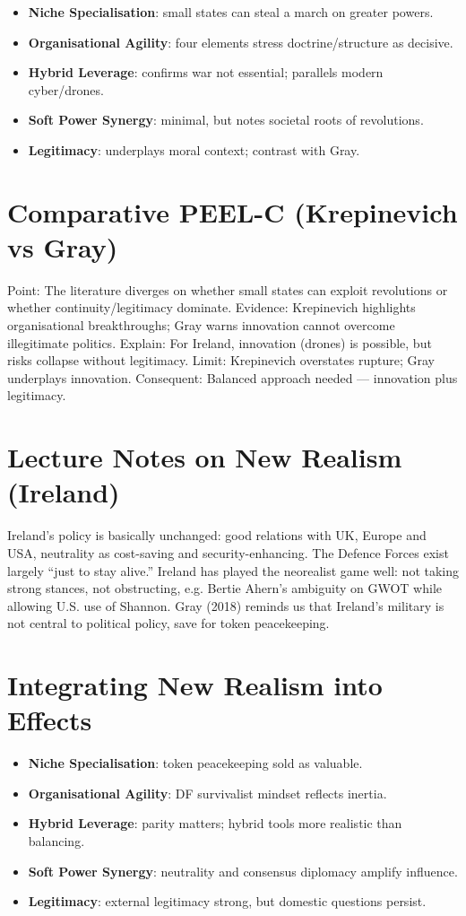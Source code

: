 \begin{itemize}
	\item \textbf{Niche Specialisation}: small states can steal a march on greater powers.  
	\item \textbf{Organisational Agility}: four elements stress doctrine/structure as decisive.  
	\item \textbf{Hybrid Leverage}: confirms war not essential; parallels modern cyber/drones.  
	\item \textbf{Soft Power Synergy}: minimal, but notes societal roots of revolutions.  
	\item \textbf{Legitimacy}: underplays moral context; contrast with Gray.  
\end{itemize}

\section*{Comparative PEEL-C (Krepinevich vs Gray)}

Point: The literature diverges on whether small states can exploit revolutions or whether continuity/legitimacy dominate.  
Evidence: Krepinevich highlights organisational breakthroughs; Gray warns innovation cannot overcome illegitimate politics.  
Explain: For Ireland, innovation (drones) is possible, but risks collapse without legitimacy.  
Limit: Krepinevich overstates rupture; Gray underplays innovation.  
Consequent: Balanced approach needed — innovation plus legitimacy.  

\section*{Lecture Notes on New Realism (Ireland)}

Ireland’s policy is basically unchanged: good relations with UK, Europe and USA, neutrality as cost-saving and security-enhancing. The Defence Forces exist largely “just to stay alive.” Ireland has played the neorealist game well: not taking strong stances, not obstructing, e.g. Bertie Ahern’s ambiguity on GWOT while allowing U.S. use of Shannon. Gray (2018) reminds us that Ireland’s military is not central to political policy, save for token peacekeeping.  

\section*{Integrating New Realism into Effects}

\begin{itemize}
	\item \textbf{Niche Specialisation}: token peacekeeping sold as valuable.  
	\item \textbf{Organisational Agility}: DF survivalist mindset reflects inertia.  
	\item \textbf{Hybrid Leverage}: parity matters; hybrid tools more realistic than balancing.  
	\item \textbf{Soft Power Synergy}: neutrality and consensus diplomacy amplify influence.  
	\item \textbf{Legitimacy}: external legitimacy strong, but domestic questions persist.  
\end{itemize}

